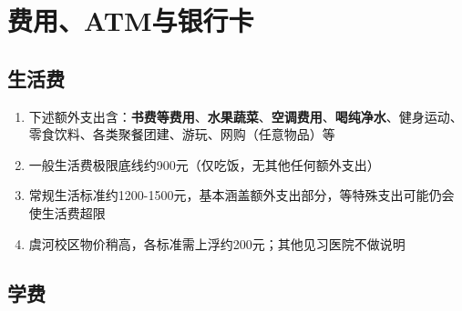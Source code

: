 \section[费用、ATM与银行卡]{费用、ATM与银行卡}

\subsection[生活费]{生活费}
\begin{enumerate}
    \item 下述额外支出含：\textbf{书费等费用}、\textbf{水果蔬菜}、\textbf{空调费用}、\textbf{喝纯净水}、健身运动、零食饮料、各类聚餐团建、游玩、网购（任意物品）等
    \item 一般生活费极限底线约900元（仅吃饭，无其他任何额外支出\footnotemark）
    \item 常规生活标准约1200-1500元，基本涵盖额外支出部分，等特殊支出可能仍会使生活费超限
    \item 虞河校区物价稍高，各标准需上浮约200元；其他见习医院不做说明
\end{enumerate}

\subsection[学费]{学费\footnotemark}
